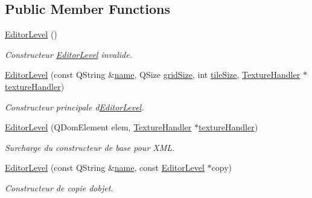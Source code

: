 \subsection*{Public Member Functions}
\begin{DoxyCompactItemize}
\item 
\hypertarget{class_editor_level_a584cef2dd87020e4998472ed42393b33}{}\hyperlink{class_editor_level_a584cef2dd87020e4998472ed42393b33}{Editor\+Level} ()\label{class_editor_level_a584cef2dd87020e4998472ed42393b33}

\begin{DoxyCompactList}\small\item\em Constructeur \hyperlink{class_editor_level}{Editor\+Level} invalide. \end{DoxyCompactList}\item 
\hyperlink{class_editor_level_aeca7a61d95d490886d20511d23d14bc6}{Editor\+Level} (const Q\+String \&\hyperlink{class_editor_level_a9f9dbcffe902389116e3456e7f154a63}{name}, Q\+Size \hyperlink{class_editor_level_af1274ae16db55ca0f0458771f9b492f7}{grid\+Size}, int \hyperlink{class_editor_level_a017777a7184231516d4052b83a61c2ec}{tile\+Size}, \hyperlink{class_texture_handler}{Texture\+Handler} $\ast$\hyperlink{class_editor_level_a1c7d7af96145635ca7a6b896bc00a2ee}{texture\+Handler})
\begin{DoxyCompactList}\small\item\em Constructeur principale d\textquotesingle{}\hyperlink{class_editor_level}{Editor\+Level}. \end{DoxyCompactList}\item 
\hyperlink{class_editor_level_a238746863d07574a8cccfe291d699118}{Editor\+Level} (Q\+Dom\+Element elem, \hyperlink{class_texture_handler}{Texture\+Handler} $\ast$\hyperlink{class_editor_level_a1c7d7af96145635ca7a6b896bc00a2ee}{texture\+Handler})
\begin{DoxyCompactList}\small\item\em Surcharge du constructeur de base pour X\+M\+L. \end{DoxyCompactList}\item 
\hyperlink{class_editor_level_a43461c77563a236e93434729fafbf670}{Editor\+Level} (const Q\+String \&\hyperlink{class_editor_level_a9f9dbcffe902389116e3456e7f154a63}{name}, const \hyperlink{class_editor_level}{Editor\+Level} $\ast$copy)
\begin{DoxyCompactList}\small\item\em Constructeur de copie d\textquotesingle{}objet. \end{DoxyCompactList}\item 

\end{DoxyCompactItemize}
